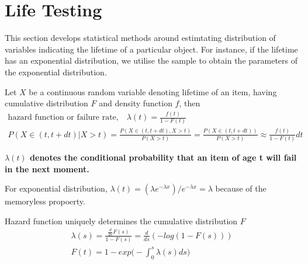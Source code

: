 \documentclass[../probability-notes.tex]{subfiles}
\begin{document}
    \section{Life Testing}\label{sec:life_testing}
    This section develops statistical methods around estimtating distribution of variables indicating the lifetime of a particular object. For instance, if the lifetime has an exponential distribution, we utilise the sample to obtain the parameters of the exponential distribution.\newline

    Let $X$ be a continuous random variable denoting lifetime of an item, having cumulative distribution $F$ and density function $f$, then
    \begin{gather*}
        \text{hazard function or failure rate,} \quad \lambda(t) = \frac{f(t)}{1 - F(t)}\\
        P(X \in (t, t+dt)|X > t) = \frac{P(X \in (t, t+dt), X > t)}{P(X > t)} = \frac{P(X \in (t, t+dt))}{P(X > t)} \approx \frac{f(t)}{1 - F(t)} dt
    \end{gather*}

    \textbf{$\lambda(t)$ denotes the conditional probability that an item of age t will fail in the next moment.}\newline

    For exponential distribution, $\lambda(t) = (\lambda e^{-\lambda x})/e^{-\lambda x} = \lambda$ because of the memoryless propoerty.\newline

    Hazard function uniquely determines the cumulative distribution $F$
    \begin{gather*}
        \lambda(s) = \frac{\frac{d}{ds} F(s)}{1 - F(s)} = \frac{d}{ds} (-log(1 - F(s)))\\
        F(t) = 1 - exp\big(-\int_{0}^{s} \lambda(s) ds \big)
    \end{gather*}

\end{document}
